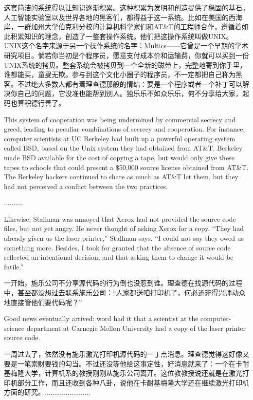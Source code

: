 \ifdefined\chs
这套简洁的系统得以让知识逐渐积累。这种积累为发明和创造提供了稳固的基石。人工智能实验室以及世界各地的黑客们，都得益于这一系统。比如在美国的西海岸，一群加州大学伯克利分校的计算机科学家们和AT\&T的工程师合作，遵循着如此积累知识的理念，创造了一整套操作系统。他们把这操作系统叫做UNIX。UNIX这个名字来源于另一个操作系统的名字：Multics——它曾是一个早期的学术研究项目。倘若你当初是个程序员，愿意支付成本价和运输费，你就可以买到一份UNIX系统的拷贝。整套系统会被拷贝到一个全新的磁带上，完整地寄到你手里，谁都能买，童叟无欺。参与到这个文化小圈子的程序员，不一定都把自己称为黑客。不过绝大多数人都有着理查德那般的情结：要是一个程序或者一个补丁可以解决你自己的问题，它没准也能帮到别人。独乐乐不如众乐乐，何不分享给大家，起码也算积德行善了。
\fi

\ifdefined\eng
This system of cooperation was being undermined by commercial secrecy and greed, leading to peculiar combinations of secrecy and cooperation.  For instance, computer scientists at UC Berkeley had built up a powerful operating system called BSD, based on the Unix system they had obtained from AT\&T.  Berkeley made BSD available for the cost of copying a tape, but would only give these tapes to schools that could present a \$50,000 source license obtained from AT\&T.  The Berkeley hackers continued to share as much as AT\&T let them, but they had not perceived a conflict between the two practices.
\fi

\ifdefined\chs
..........
\fi

\ifdefined\eng
Likewise, Stallman was annoyed that Xerox had not provided the source-code files, but not yet angry.  He never thought of asking Xerox for a copy. ``They had already given us the laser printer,'' Stallman says. ``I could not say they owed us something more.  Besides, I took for granted that the absence of source code reflected an intentional decision, and that asking them to change it would be futile.''
\fi

\ifdefined\chs
一开始，施乐公司不分享源代码的行为倒也没惹到谁。理查德在找源代码的过程中，甚至都没想过去联系施乐公司：“人家都送咱打印机了，何必还非得兴师动众地直接管他们要代码呢？”
\fi

\ifdefined\eng
Good news eventually arrived: word had it that a scientist at the computer-science department at Carnegie Mellon University had a copy of the laser printer source code.
\fi

\ifdefined\chs
一周过去了，依然没有施乐激光打印机源代码的一丁点消息。理查德觉得这好像又要是一笔索财要钱的勾当。不过还没等他给这事定性，好消息就来了：一个在卡耐基梅隆大学，计算机系的教授刚刚从施乐公司离开。这位教教授说还就是在激光打印机部分工作，而且还收到各种八卦，说他在卡耐基梅隆大学还在继续激光打印机方面的研究。........................
\fi

